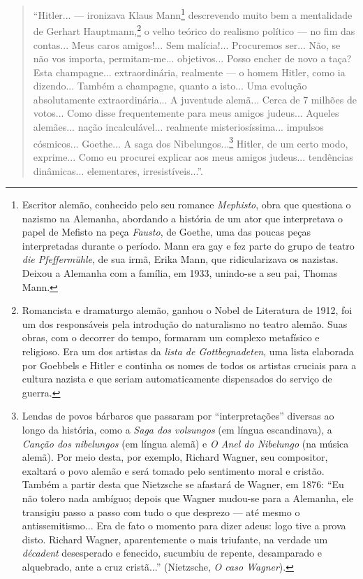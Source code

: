 \begin{quote}
``Hitler... --- ironizava Klaus Mann\footnote{Escritor alemão, conhecido pelo seu romance \emph{Mephisto}, obra que
  questiona o nazismo na Alemanha, abordando a história de um ator que
  interpretava o papel de Mefisto na peça \emph{Fausto}, de Goethe, uma
  das poucas peças interpretadas durante o período. Mann era gay e fez
  parte do grupo de teatro \emph{die Pfeffermühle}, de sua irmã, Erika
  Mann, que ridicularizava os nazistas. Deixou a Alemanha com a família,
  em 1933, unindo-se a seu pai, Thomas Mann.} descrevendo muito bem a mentalidade de Gerhart
Hauptmann,\footnote{Romancista e dramaturgo alemão, ganhou o Nobel de Literatura de 1912,
  foi um dos responsáveis pela introdução do naturalismo no teatro
  alemão. Suas obras, com o decorrer do tempo, formaram um complexo
  metafísico e religioso. Era um dos artistas da \emph{lista de
  Gottbegnadeten}, uma lista elaborada por Goebbels e Hitler e continha
  os nomes de todos os artistas cruciais para a cultura nazista e que
  seriam automaticamente dispensados do serviço de guerra.} o velho teórico do realismo político --- no fim das
contas... Meus caros amigos!... Sem malícia!... Procuremos ser... Não,
se não vos importa, permitam-me... objetivos... Posso encher de novo a
taça? Esta champagne... extraordinária, realmente --- o homem Hitler,
como ia dizendo... Também a champagne, quanto a isto... Uma evolução
absolutamente extraordinária... A juventude alemã... Cerca de 7 milhões
de votos... Como disse frequentemente para meus amigos judeus... Aqueles
alemães... nação incalculável... realmente misteriosíssima... impulsos
cósmicos... Goethe... A saga dos Nibelungos...\footnote{Lendas de povos bárbaros que
  passaram por ``interpretações'' diversas ao longo da história, como a
  \emph{Saga dos volsungos} (em língua escandinava), a \emph{Canção dos
  nibelungos} (em língua alemã) e \emph{O Anel do Nibelungo} (na música
  alemã). Por meio desta, por exemplo, Richard Wagner, seu compositor,
  exaltará o povo alemão e será tomado pelo sentimento moral e cristão.
  Também a partir desta que Nietzsche se afastará de Wagner, em 1876:
  ``Eu não tolero nada ambíguo; depois que Wagner mudou-se para a
  Alemanha, ele transigiu passo a passo com tudo o que desprezo --- até
  mesmo o antissemitismo... Era de fato o momento para dizer adeus: logo
  tive a prova disto. Richard Wagner, aparentemente o mais triufante, na
  verdade um \emph{décadent} desesperado e fenecido, sucumbiu de
  repente, desamparado e alquebrado, ante a cruz cristã...'' (Nietzsche,
  \emph{O caso Wagner}).} Hitler, de um certo modo, exprime... Como eu procurei
explicar aos meus amigos judeus... tendências dinâmicas... elementares,
irresistíveis...''.


\end{quote}
